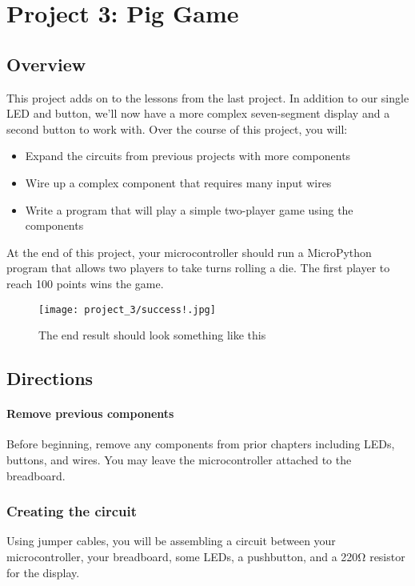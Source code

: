 \chapter{Project 3: Pig Game}

\section{Overview}
This project adds on to the lessons from the last project. In addition to our single LED and button,
we'll now have a more complex seven-segment display and a second button to work with.
Over the course of this project, you will:
\begin{itemize}
    \item Expand the circuits from previous projects with more components
    \item Wire up a complex component that requires many input wires
    \item Write a program that will play a simple two-player game using the components
\end{itemize}
At the end of this project, your microcontroller should run a MicroPython program that allows
two players to take turns rolling a die. The first player to reach 100 points wins the game.
\begin{figure}[H]
\centering
    \texttt{[image: project\_3/success!.jpg]}
    \caption{The end result should look something like this}
\end{figure}

\pagebreak

\section{Directions}

\subsubsection{Remove previous components}
Before beginning, remove any components from prior chapters including LEDs, buttons, and wires. You may leave the
microcontroller attached to the breadboard.

\subsection{Creating the circuit}
Using jumper cables, you will be assembling a circuit between your microcontroller, your breadboard,
some LEDs, a pushbutton, and a 220\si{\ohm} resistor for the display.

